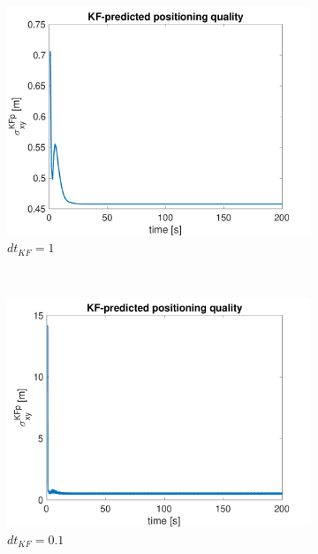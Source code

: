 \documentclass{article}
\begin{document}
\begin{figure}[H]
    \centering
    \begin{subfigure}[t]{0.49\textwidth}
        \centering
        \includegraphics[width=\textwidth]{dt1/sigma_KFp}
        \caption{$dt_{KF} = 1$}
    \end{subfigure}
    ~
    \begin{subfigure}[t]{0.49\textwidth}
        \centering
        \includegraphics[width=\textwidth]{dt01/sigma_KFp}
        \caption{$dt_{KF} = 0.1$}
    \end{subfigure}
    ~
    \begin{subfigure}[t]{0.49\textwidth}
        \centering

\end{subfigure}
\end{figure}
\end{document}
